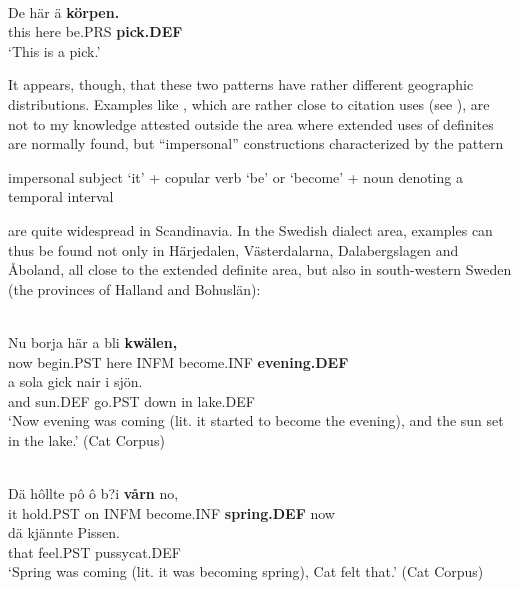 \ea \label{} 
\\
\gll De  här  ä  \textbf{körpen.}\\
this  here  be.PRS  \textbf{pick.DEF}\\
\glt ‘This is a pick.’

\z

It appears, though, that these two patterns have rather different geographic distributions. Examples like , which are rather close to citation uses (see ), are not to my knowledge attested outside the area where extended uses of definites are normally found, but “impersonal” constructions characterized by the pattern

impersonal subject ‘it’ + copular verb ‘be’ or ‘become’ + noun denoting a temporal interval


are quite widespread in Scandinavia. In the Swedish dialect area, examples can thus be found not only in Härjedalen, Västerdalarna, Dalabergslagen and Åboland, all close to the extended definite area, but also in south-western Sweden (the provinces of Halland and Bohuslän): 

\ea \label{} 
\\
\gll Nu  borja  här  a  bli  \textbf{kwälen,} \\
now  begin.PST  here  INFM  become.INF  \textbf{evening.DEF} \\
\gll a  sola  gick  nair  i  sjön.\\
and  sun.DEF  go.PST  down  in  lake.DEF\\
\glt ‘Now evening was coming (lit. it started to become the evening), and the sun set in the lake.’ (Cat Corpus)

\z

\ea \label{} 
\\
\gll Dä  hôllte  pô  ô  b?i  \textbf{vårn} no,\\
it  hold.PST  on  INFM  become.INF  \textbf{spring.DEF} now\\
\gll dä  kjännte  Pissen.\\
that  feel.PST  pussycat.DEF\\
\glt ‘Spring was coming (lit. it was becoming spring), Cat felt that.’ (Cat Corpus)

\z

